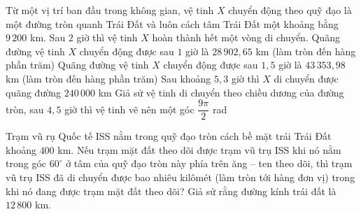 \begin{ex}%
	Từ một vị  trí ban đầu trong không gian, vệ tinh $X$ chuyển động theo quỹ đạo là một đường tròn quanh Trái Đất và luôn cách tâm Trái Đất một khoảng bằng $9\,200$ km. Sau $2$ giờ thì vệ tinh $X$ hoàn thành hết một vòng di chuyển.
	 \choiceTF
		{\True Quãng đường vệ tinh $X$ chuyển động được sau $1$ giờ là  $28\,902{,}65$ km (làm tròn đến hàng phần trăm)}
		{\True Quãng đường vệ tinh $X$ chuyển động được sau $1{,}5$ giờ là  $43\,353{,}98$ km (làm tròn đến hàng phần trăm)}
		{Sau khoảng $5{,}3$ giờ thì $X$ di chuyển được quãng  đường $240\,000$ km}
		{\True Giả sử vệ tinh di chuyển theo chiều dương của đường tròn, sau $4{,}5$ giờ thì vệ tinh vẽ nên một  góc $\dfrac{9\pi}{2}$ rad}
\end{ex}



\begin{ex}%
	Trạm vũ rụ Quốc tế ISS nằm trong quỹ đạo tròn cách bề mặt trái Trái Đất khoảng $400$ km. Nếu trạm mặt đất theo dõi được trạm vũ trụ ISS khi nó nằm trong góc $60^\circ$ ở tâm của quỹ đạo tròn này phía trên ăng – ten theo dõi, thì trạm vũ  trụ ISS đã di chuyển được bao nhiêu kilômét (làm tròn tới hàng đơn vị) trong khi nó đang được trạm mặt đất theo dõi? Giả sử rằng đường kính trái đất là $12\,800$ km.
\end{ex}

